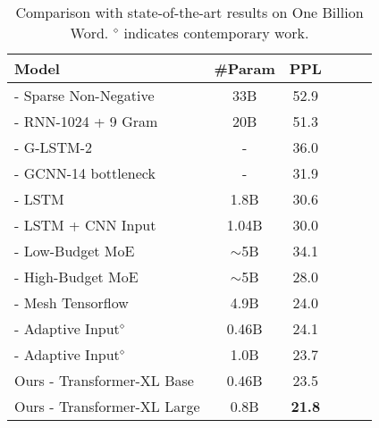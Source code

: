 \bgroup
\setlength{\tabcolsep}{2pt}
\begin{table}[t]
	\small
	\centering
	\begin{adjustwidth}{-4pt}{}
		
	\begin{tabular}{l|ccccc}
		\toprule
		\bf Model & \bf \#Param & \bf PPL \\
		\midrule
		\citet{shazeer2014skip} - Sparse Non-Negative & 33B & 52.9 \\
		\citet{chelba2013one} - RNN-1024 + 9 Gram & 20B & 51.3 \\
		\citet{kuchaiev2017factorization} - G-LSTM-2 & - & 36.0 \\
		\citet{dauphin2016language} - GCNN-14 bottleneck & - & 31.9 \\
		\citet{jozefowicz2016exploring} - LSTM & 1.8B & 30.6 \\
		\citet{jozefowicz2016exploring} - LSTM + CNN Input & 1.04B & 30.0 \\
		\citet{shazeer2017outrageously} - Low-Budget MoE & $\sim$5B & 34.1 \\
		\citet{shazeer2017outrageously} - High-Budget MoE & $\sim$5B & 28.0 \\
		\citet{shazeer2018mesh} - Mesh Tensorflow & 4.9B & 24.0 \\
		\citet{baevski2018adaptive} - Adaptive Input$^\diamond$ & 0.46B & 24.1 \\
		\citet{baevski2018adaptive} - Adaptive Input$^\diamond$ & 1.0B & 23.7 \\
		\midrule
		Ours - Transformer-XL Base & 0.46B & 23.5 \\
		Ours - Transformer-XL Large & 0.8B & \textbf{21.8} \\
		\bottomrule
	\end{tabular}
	\caption{\small
		Comparison with state-of-the-art results on One Billion Word. $^\diamond$ indicates contemporary work.
	}
	\label{table:lm1b}
	\end{adjustwidth}
\end{table}

